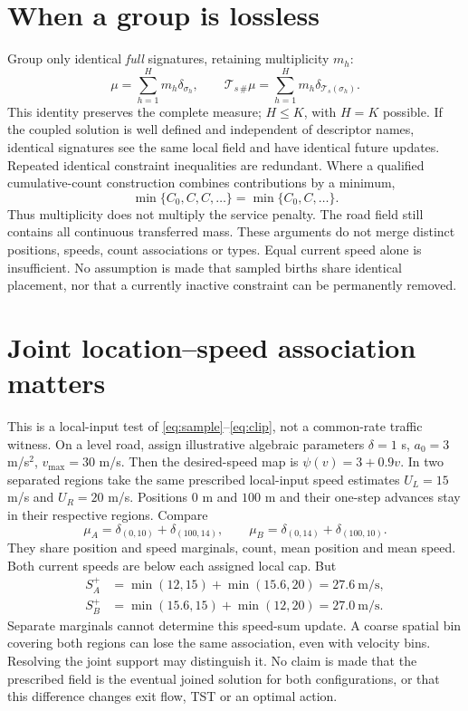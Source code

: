 \documentclass[11pt]{article}
\newcommand{\CM}{\mathcal{T}}
\begin{document}
\section{When a group is lossless}
Group only identical \emph{full} signatures, retaining multiplicity $m_h$:
\begin{equation}
 \mu=\sum_{h=1}^{H}m_h\delta_{\sigma_h},\qquad
 \CM_{s\,\#}\mu=\sum_{h=1}^{H}m_h\delta_{\CM_s(\sigma_h)}.
 \label{eq:groups}
\end{equation}
This identity preserves the complete measure; $H\leq K$, with $H=K$ possible.
If the coupled solution is well defined and independent of descriptor names,
identical signatures see the same local field and have identical future
updates. Repeated identical constraint inequalities are redundant. Where a
qualified cumulative-count construction combines contributions by a minimum,
\begin{equation}
 \min\{C_0,C,C,\ldots\}=\min\{C_0,C,\ldots\}. \label{eq:idempotent}
\end{equation}
Thus multiplicity does not multiply the service penalty. The road field still
contains all continuous transferred mass. These arguments do not merge distinct
positions, speeds, count associations or types. Equal current speed alone is
insufficient. No assumption is made that sampled births share identical
placement, nor that a currently inactive constraint can be permanently removed.

\section{Joint location--speed association matters}
This is a local-input test of \eqref{eq:sample}--\eqref{eq:clip}, not a common-rate
traffic witness. On a level road, assign illustrative algebraic parameters
$\delta=1$ s, $a_0=3$ m/s$^2$, $v_{\max}=30$ m/s. Then the desired-speed map is
$\psi(v)=3+0.9v$. In two separated regions take the same prescribed local-input
speed estimates $U_L=15$ m/s and $U_R=20$ m/s. Positions $0$ m and $100$ m and
their one-step advances stay in their respective regions. Compare
\begin{equation}
 \mu_A=\delta_{(0,10)}+\delta_{(100,14)},\qquad
 \mu_B=\delta_{(0,14)}+\delta_{(100,10)}. \label{eq:swap}
\end{equation}
They share position and speed marginals, count, mean position and mean speed.
Both current speeds are below each assigned local cap. But
\begin{align}
 S_A^+&=\min(12,15)+\min(15.6,20)=27.6\ \mathrm{m/s},\\
 S_B^+&=\min(15.6,15)+\min(12,20)=27.0\ \mathrm{m/s}. \label{eq:sums}
\end{align}
Separate marginals cannot determine this speed-sum update. A coarse spatial bin
covering both regions can lose the same association, even with velocity bins.
Resolving the joint support may distinguish it. No claim is made that the
prescribed field is the eventual joined solution for both configurations, or
that this difference changes exit flow, TST or an optimal action.
\end{document}
